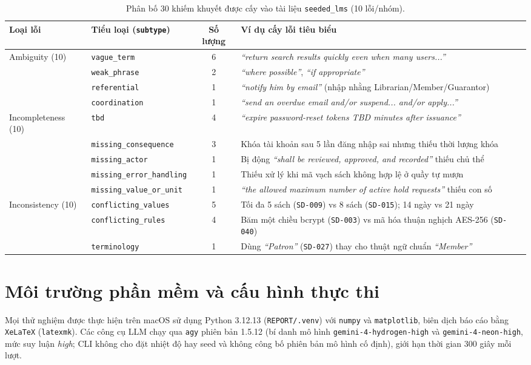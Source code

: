 \documentclass[12pt,a4paper]{report}
\begin{document}
\begin{table}[H]
\centering
\caption{Phân bố 30 khiếm khuyết được cấy vào tài liệu \texttt{seeded\_lms} (10 lỗi/nhóm).}
\label{tab:seeded_dist}
\small
\begin{tabular}{llc p{6.8cm}}
\toprule
\textbf{Loại lỗi} & \textbf{Tiểu loại (\texttt{subtype})} & \textbf{Số lượng} & \textbf{Ví dụ cấy lỗi tiêu biểu} \\
\midrule
Ambiguity (10) & \texttt{vague\_term} & 6 & \textit{``return search results quickly even when many users...''} \\
 & \texttt{weak\_phrase} & 2 & \textit{``where possible''}, \textit{``if appropriate''} \\
 & \texttt{referential} & 1 & \textit{``notify him by email''} (nhập nhằng Librarian/Member/Guarantor) \\
 & \texttt{coordination} & 1 & \textit{``send an overdue email and/or suspend... and/or apply...''} \\
\midrule
Incompleteness (10) & \texttt{tbd} & 4 & \textit{``expire password-reset tokens TBD minutes after issuance''} \\
 & \texttt{missing\_consequence} & 3 & Khóa tài khoản sau 5 lần đăng nhập sai nhưng thiếu thời lượng khóa \\
 & \texttt{missing\_actor} & 1 & Bị động \textit{``shall be reviewed, approved, and recorded''} thiếu chủ thể \\
 & \texttt{missing\_error\_handling} & 1 & Thiếu xử lý khi mã vạch sách không hợp lệ ở quầy tự mượn \\
 & \texttt{missing\_value\_or\_unit} & 1 & \textit{``the allowed maximum number of active hold requests''} thiếu con số \\
\midrule
Inconsistency (10) & \texttt{conflicting\_values} & 5 & Tối đa 5 sách (\texttt{SD-009}) vs 8 sách (\texttt{SD-015}); 14 ngày vs 21 ngày \\
 & \texttt{conflicting\_rules} & 4 & Băm một chiều bcrypt (\texttt{SD-003}) vs mã hóa thuận nghịch AES-256 (\texttt{SD-040}) \\
 & \texttt{terminology} & 1 & Dùng \textit{``Patron''} (\texttt{SD-027}) thay cho thuật ngữ chuẩn \textit{``Member''} \\
\bottomrule
\end{tabular}
\end{table}

\section{Môi trường phần mềm và cấu hình thực thi}
Mọi thử nghiệm được thực hiện trên macOS sử dụng Python 3.12.13 (\texttt{REPORT/.venv}) với \texttt{numpy} và \texttt{matplotlib}, biên dịch báo cáo bằng \texttt{XeLaTeX} (\texttt{latexmk}). Các công cụ LLM chạy qua \texttt{agy} phiên bản 1.5.12 (bí danh mô hình \texttt{gemini-4-hydrogen-high} và \texttt{gemini-4-neon-high}, mức suy luận \textit{high}; CLI không cho đặt nhiệt độ hay seed và không công bố phiên bản mô hình cố định), giới hạn thời gian 300 giây mỗi lượt.
\end{document}
